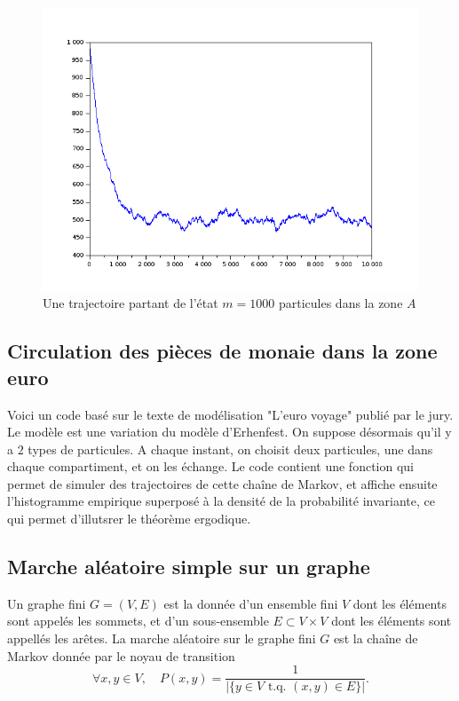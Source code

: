 \begin{figure}[h]\centering
\includegraphics[scale=0.4]{Ehrenfest.png}
\caption{Une trajectoire partant de l'état $m=1000$ particules dans la zone $A$}
\label{fig:Ehrenfest}
\end{figure}

\subsection{Circulation des pièces de monaie dans la zone euro}

Voici un code basé sur le texte de modélisation "L'euro voyage" publié par le jury. Le modèle est une variation du modèle d'Erhenfest. On suppose désormais qu'il y a $2$ types de particules. A chaque instant, on choisit deux particules, une dans chaque compartiment, et on les échange. Le code contient une fonction qui permet de simuler des trajectoires de cette chaîne de Markov, et affiche ensuite l'histogramme empirique superposé à la densité de la probabilité invariante, ce qui permet d'illutsrer le théorème ergodique.



\subsection{Marche aléatoire simple sur un graphe}

\begin{definition}
Un graphe fini $G=(V,E)$ est la donnée d'un ensemble fini $V$ dont les éléments sont appelés les sommets, et d'un sous-ensemble $E\subset V\times V$ dont les éléments sont appellés les arêtes. La marche aléatoire sur le graphe fini $G$ est la chaîne de Markov donnée par le noyau de transition 
\[\forall x,y\in V,\quad P(x,y) = \frac{1}{|\{ y \in V \text{ t.q. } (x,y)\in E\}|}.\]
\end{definition}

